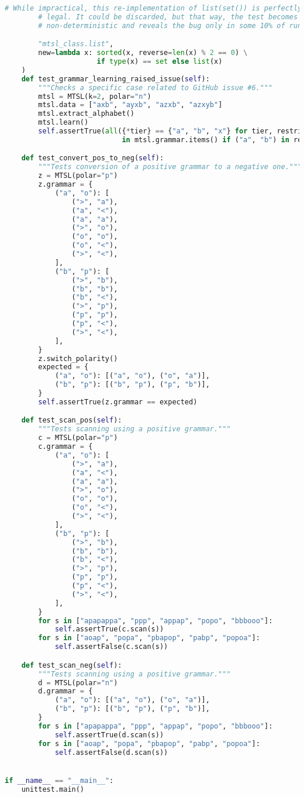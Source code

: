\begin{lstlisting}[language=Python]
        # While impractical, this re-implementation of list(set()) is perfectly
        # legal. It could be discarded, but that way, the test becomes
        # non-deterministic and reveals the bug only in some 10% of runs.

        "mtsl_class.list", 
        new=lambda x: sorted(x, reverse=len(x) % 2 == 0) \
                      if type(x) == set else list(x)
    )
    def test_grammar_learning_raised_issue(self):
        """Checks a specific case related to GitHub issue #6."""
        mtsl = MTSL(k=2, polar="n")
        mtsl.data = ["axb", "ayxb", "azxb", "azxyb"]
        mtsl.extract_alphabet()
        mtsl.learn()
        self.assertTrue(all({*tier} == {"a", "b", "x"} for tier, restrict \
                            in mtsl.grammar.items() if ("a", "b") in restrict))

    def test_convert_pos_to_neg(self):
        """Tests conversion of a positive grammar to a negative one."""
        z = MTSL(polar="p")
        z.grammar = {
            ("a", "o"): [
                (">", "a"),
                ("a", "<"),
                ("a", "a"),
                (">", "o"),
                ("o", "o"),
                ("o", "<"),
                (">", "<"),
            ],
            ("b", "p"): [
                (">", "b"),
                ("b", "b"),
                ("b", "<"),
                (">", "p"),
                ("p", "p"),
                ("p", "<"),
                (">", "<"),
            ],
        }
        z.switch_polarity()
        expected = {
            ("a", "o"): [("a", "o"), ("o", "a")],
            ("b", "p"): [("b", "p"), ("p", "b")],
        }
        self.assertTrue(z.grammar == expected)

    def test_scan_pos(self):
        """Tests scanning using a positive grammar."""
        c = MTSL(polar="p")
        c.grammar = {
            ("a", "o"): [
                (">", "a"),
                ("a", "<"),
                ("a", "a"),
                (">", "o"),
                ("o", "o"),
                ("o", "<"),
                (">", "<"),
            ],
            ("b", "p"): [
                (">", "b"),
                ("b", "b"),
                ("b", "<"),
                (">", "p"),
                ("p", "p"),
                ("p", "<"),
                (">", "<"),
            ],
        }
        for s in ["apapappa", "ppp", "appap", "popo", "bbbooo"]:
            self.assertTrue(c.scan(s))
        for s in ["aoap", "popa", "pbapop", "pabp", "popoa"]:
            self.assertFalse(c.scan(s))

    def test_scan_neg(self):
        """Tests scanning using a positive grammar."""
        d = MTSL(polar="n")
        d.grammar = {
            ("a", "o"): [("a", "o"), ("o", "a")],
            ("b", "p"): [("b", "p"), ("p", "b")],
        }
        for s in ["apapappa", "ppp", "appap", "popo", "bbbooo"]:
            self.assertTrue(d.scan(s))
        for s in ["aoap", "popa", "pbapop", "pabp", "popoa"]:
            self.assertFalse(d.scan(s))


if __name__ == "__main__":
    unittest.main()

\end{lstlisting}

